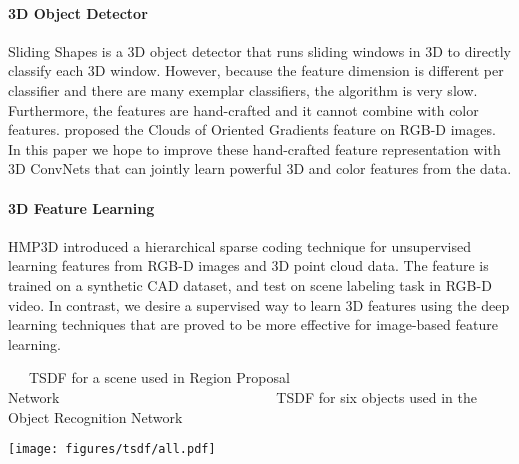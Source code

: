 \documentclass[10pt,twocolumn,letterpaper]{article}
\begin{document}
\vspace{-4mm}\paragraph{3D Object Detector}
Sliding Shapes \cite{SlidingShapes} is a 3D object detector that runs sliding windows in 3D to directly classify each 3D window.
However, because the feature dimension is different per classifier and there are many exemplar classifiers,
the algorithm is very slow.
Furthermore, the features are hand-crafted and it cannot combine with color features.
\cite{Zhile2016COG} proposed the Clouds of Oriented Gradients feature on RGB-D images.
In this paper we hope to improve these hand-crafted feature representation with 3D ConvNets that can jointly learn powerful 3D and color features from the data.

\vspace{-4mm}\paragraph{3D Feature Learning}
HMP3D \cite{lai2014unsupervised} introduced
a hierarchical sparse coding technique for unsupervised learning features from RGB-D images and 3D point cloud data. 
The feature is trained on a synthetic CAD dataset, and test on scene labeling task in RGB-D video. 
In contrast, we desire a supervised way to learn 3D features using the deep learning techniques that are proved to be more effective for image-based feature learning.



\begin{figure*}[t]

\vspace{-3mm}

{\footnotesize
~~~TSDF for a scene used in Region Proposal Network~~~~~~~~~~~~~~~~~~~~~~~~~~~~~~~TSDF for six objects used in the Object Recognition Network
}

\texttt{[image: figures/tsdf/all.pdf]}

\caption{{\bf Visualization of TSDF Encoding.} We only visualize the TSDF values when close to the surface. 
Red indicates the voxel is in front of surfaces; and blue indicates the voxel is behind the surface. 
The resolution is 208208100 for the Region Proposal Network, and 303030 for the Object Recognition Network.}
\label{fig:tsdf}
\vspace{-3mm}
\end{figure*}
\end{document}
